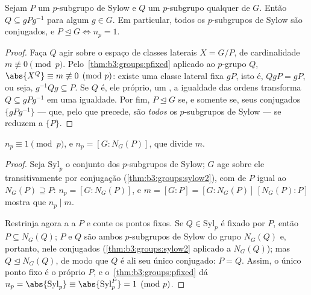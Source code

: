 \begin{theorem}\label{thm:b3:groups:sylow2}
Sejam $P$ um $p$-subgrupo de Sylow e $Q$ um $p$-subgrupo
qualquer de $G$. Então $Q \subseteq gPg^{-1}$ para algum $g \in G$. Em particular, todos
os $p$-subgrupos de Sylow são conjugados, e $P \trianglelefteq G \iff
n_p = 1$.
\end{theorem}

\begin{proof}
Faça $Q$ agir sobre o espaço de classes laterais $X = G/P$, de
cardinalidade $m
\not\equiv 0 \pmod p$. Pelo~\cref{thm:b3:groups:pfixed} aplicado ao $p$-grupo
$Q$, $\abs{X^Q} \equiv m \not\equiv 0 \pmod p$: existe uma classe lateral fixa $gP$, isto é, $QgP = gP$,
ou seja, $g^{-1}Qg \subseteq
P$. Se $Q$ é, ele próprio, um , a
igualdade das ordens transforma $Q \subseteq gPg^{-1}$ em uma igualdade. Por fim, $P
\trianglelefteq G$
se, e somente se, seus conjugados $\{gPg^{-1}\}$ --- que, pelo que precede, são
\emph{todos} os $p$-subgrupos de Sylow --- se reduzem a $\{P\}$.
\end{proof}

\begin{theorem}\label{thm:b3:groups:sylow3}
$n_p \equiv 1 \pmod p$, e $n_p = [G : N_G(P)]$, que divide $m$.
\end{theorem}

\begin{proof}
Seja $\mathrm{Syl}_p$ o conjunto dos $p$-subgrupos de Sylow; $G$ age sobre
ele transitivamente por conjugação (\cref{thm:b3:groups:sylow2}), com 
de $P$ igual ao  $N_G(P) \supseteq P$: $n_p = [G :
N_G(P)]$, e $m = [G:P] = [G:N_G(P)]\,[N_G(P):P]$ mostra que $n_p \mid
m$.

Restrinja agora a  a $P$ e conte os pontos fixos. Se $Q \in
\mathrm{Syl}_p$ é
fixado por $P$, então $P \subseteq N_G(Q)$; $P$ e $Q$ são ambos
$p$-subgrupos de Sylow do grupo $N_G(Q)$ e, portanto, nele
conjugados (\cref{thm:b3:groups:sylow2} aplicado a $N_G(Q)$); mas $Q \trianglelefteq N_G(Q)$, de modo
que $Q$ é ali seu único conjugado: $P = Q$. Assim, o único
ponto fixo é o próprio $P$, e o~\cref{thm:b3:groups:pfixed} dá $n_p = \abs{\mathrm{Syl}_p}
\equiv \abs{\mathrm{Syl}_p^P} = 1 \pmod p$.
\end{proof}

